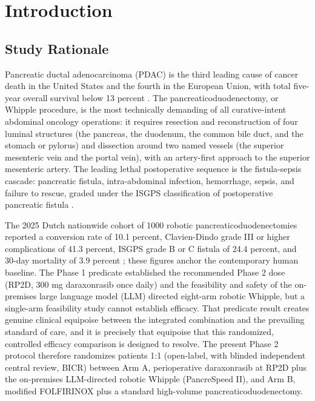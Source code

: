 \section{Introduction}

\subsection{Study Rationale}

Pancreatic ductal adenocarcinoma (PDAC) is the third leading cause of cancer
death in the United States and the fourth in the European Union, with total
five-year overall survival below 13 percent \cite{Siegel2025}. The
pancreaticoduodenectomy, or Whipple procedure, is the most technically demanding
of all curative-intent abdominal oncology operations: it requires resection and
reconstruction of four luminal structures (the pancreas, the duodenum, the common
bile duct, and the stomach or pylorus) and dissection around two named vessels
(the superior mesenteric vein and the portal vein), with an artery-first approach
to the superior mesenteric artery. The leading lethal postoperative sequence is
the fistula-sepsis cascade: pancreatic fistula, intra-abdominal infection,
hemorrhage, sepsis, and failure to rescue, graded under the ISGPS classification
of postoperative pancreatic fistula \cite{Bassi2017}.

The 2025 Dutch nationwide cohort of 1000 robotic pancreaticoduodenectomies
reported a conversion rate of 10.1 percent, Clavien-Dindo grade III or higher
complications of 41.3 percent, ISGPS grade B or C fistula of 24.4 percent, and
30-day mortality of 3.9 percent \cite{DutchCohort2025}; these figures anchor the
contemporary human baseline. The Phase 1 predicate \cite{kawchak2026phase1}
established the recommended Phase 2 dose (RP2D, 300 mg daraxonrasib once daily)
and the feasibility and safety of the on-premises large language model (LLM)
directed eight-arm robotic Whipple, but a single-arm feasibility study cannot
establish efficacy. That predicate result creates genuine clinical equipoise
between the integrated combination and the prevailing standard of care, and it is
precisely that equipoise that this randomized, controlled efficacy comparison is
designed to resolve. The present Phase 2 protocol therefore randomizes patients
1:1 (open-label, with blinded independent central review, BICR) between Arm A,
perioperative daraxonrasib at RP2D plus the on-premises LLM-directed robotic
Whipple (PancreSpeed II), and Arm B, modified FOLFIRINOX \cite{Conroy2018} plus a
standard high-volume pancreaticoduodenectomy.

